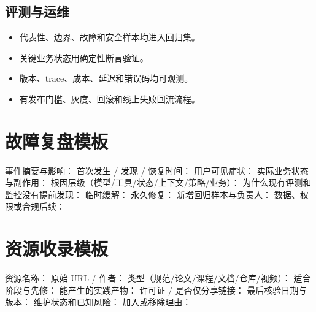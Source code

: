 \subsection{评测与运维}

\begin{itemize}
  \item \checkbox 代表性、边界、故障和安全样本均进入回归集。
  \item \checkbox 关键业务状态用确定性断言验证。
  \item \checkbox 版本、trace、成本、延迟和错误码均可观测。
  \item \checkbox 有发布门槛、灰度、回滚和线上失败回流流程。
\end{itemize}

\section{故障复盘模板}

\begin{codeblock}
事件摘要与影响：
首次发生 / 发现 / 恢复时间：
用户可见症状：
实际业务状态与副作用：
根因层级（模型/工具/状态/上下文/策略/业务）：
为什么现有评测和监控没有提前发现：
临时缓解：
永久修复：
新增回归样本与负责人：
数据、权限或合规后续：
\end{codeblock}

\section{资源收录模板}

\begin{codeblock}
资源名称：
原始 URL / 作者：
类型（规范/论文/课程/文档/仓库/视频）：
适合阶段与先修：
能产生的实践产物：
许可证 / 是否仅分享链接：
最后核验日期与版本：
维护状态和已知风险：
加入或移除理由：
\end{codeblock}
